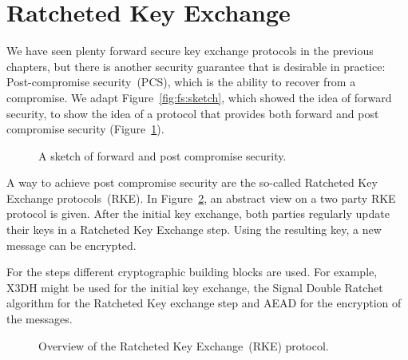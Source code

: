 \section{Ratcheted Key Exchange}
\label{sec:rke}

We have seen plenty forward secure key exchange protocols in the previous chapters, but there is another security guarantee that is desirable in practice:
Post-compromise security~(PCS), which is the ability to recover from a compromise.
We adapt Figure~\ref{fig:fs:sketch}, which showed the idea of forward security, to show the idea of a protocol that provides both forward and post compromise security (Figure~\ref{fig:rke:pcs_fs_overview}).

\begin{figure}[!ht]
    \centering
    
    \caption{A sketch of forward and post compromise security.}
    \label{fig:rke:pcs_fs_overview}
\end{figure}

A way to achieve post compromise security are the so-called Ratcheted Key Exchange protocols~(RKE).
In Figure~\ref{fig:rke:overview}, an abstract view on a two party RKE protocol is given.
After the initial key exchange, both parties regularly update their keys in a Ratcheted Key Exchange step.
Using the resulting key, a new message can be encrypted.

For the steps different cryptographic building blocks are used.
For example, X3DH might be used for the initial key exchange, the Signal Double Ratchet algorithm for the Ratcheted Key exchange step and AEAD for the encryption of the messages.

\begin{figure}[!ht]
    \centering
    
    \caption{Overview of the Ratcheted Key Exchange~(RKE) protocol.}
    \label{fig:rke:overview}
\end{figure}